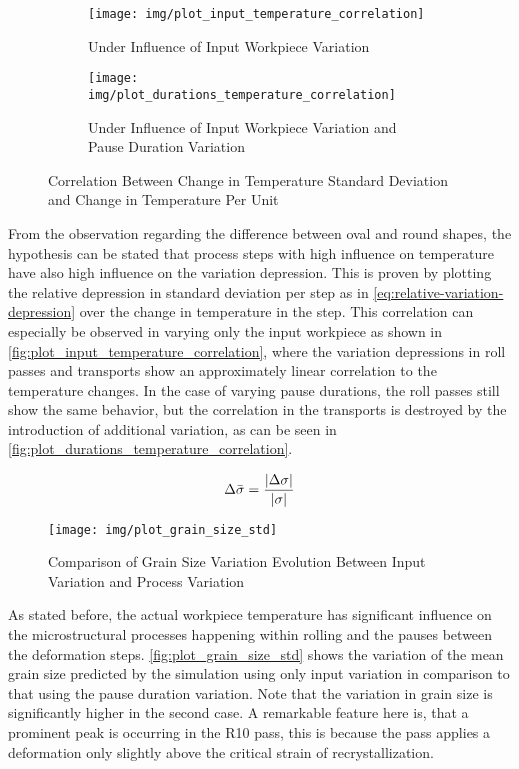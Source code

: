 \begin{figure}
    \begin{subfigure}{\linewidth}
        \centering
        \texttt{[image: img/plot\_input\_temperature\_correlation]}
        \caption{Under Influence of Input Workpiece Variation}
        \label{fig:plot_input_temperature_correlation}
    \end{subfigure}
    \begin{subfigure}{\linewidth}
        \centering
        \texttt{[image: img/plot\_durations\_temperature\_correlation]}
        \caption{Under Influence of Input Workpiece Variation and Pause Duration Variation}
        \label{fig:plot_durations_temperature_correlation}
    \end{subfigure}
    \caption{Correlation Between Change in Temperature Standard Deviation and Change in Temperature Per Unit}
\end{figure}

From the observation regarding the difference between oval and round shapes, the hypothesis can be stated that process steps with high influence on temperature have also high influence on the variation depression.
This is proven by plotting the relative depression in standard deviation per step as in \autoref{eq:relative-variation-depression} over the change in temperature in the step.
This correlation can especially be observed in varying only the input workpiece as shown in \autoref{fig:plot_input_temperature_correlation}, where the variation depressions in roll passes and transports show an approximately linear correlation to the temperature changes.
In the case of varying pause durations, the roll passes still show the same behavior, but the correlation in the transports is destroyed by the introduction of additional variation, as can be seen in \autoref{fig:plot_durations_temperature_correlation}.

\begin{equation}
    {\Delta\bar{\sigma}} = \frac{{\lvert {\Delta {\sigma}} \rvert}}{{\lvert {\sigma} \rvert}}
    \label{eq:relative-variation-depression}
\end{equation}

\begin{figure}
    \centering
    \texttt{[image: img/plot\_grain\_size\_std]}
    \caption{Comparison of Grain Size Variation Evolution Between Input Variation and Process Variation}
    \label{fig:plot_grain_size_std}
\end{figure}

As stated before, the actual workpiece temperature has significant influence on the microstructural processes happening within rolling and the pauses between the deformation steps.
\autoref{fig:plot_grain_size_std} shows the variation of the mean grain size predicted by the simulation using only input variation in comparison to that using the pause duration variation.
Note that the variation in grain size is significantly higher in the second case.
A remarkable feature here is, that a prominent peak is occurring in the R10 pass, this is because the pass applies a deformation only slightly above the critical strain of recrystallization.

